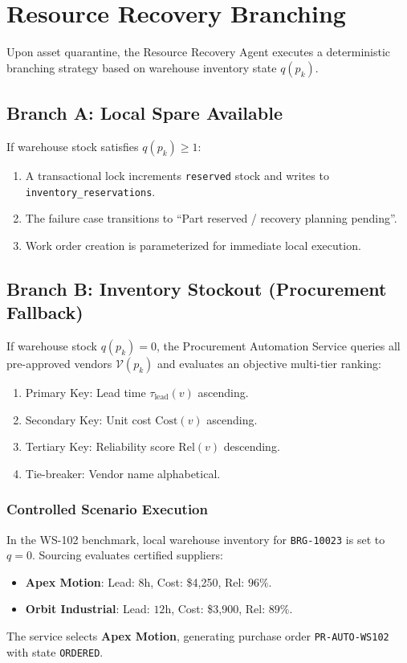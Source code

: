 \documentclass[10pt,twocolumn,a4paper]{article}
\begin{document}
\section{Resource Recovery Branching}
\label{sec:resource_recovery}
Upon asset quarantine, the Resource Recovery Agent executes a deterministic branching strategy based on warehouse inventory state $q(p_k)$.

\subsection{Branch A: Local Spare Available}
If warehouse stock satisfies $q(p_k) \ge 1$:
\begin{enumerate}
    \item A transactional lock increments \texttt{reserved} stock and writes to \texttt{inventory\_reservations}.
    \item The failure case transitions to ``Part reserved / recovery planning pending''.
    \item Work order creation is parameterized for immediate local execution.
\end{enumerate}

\subsection{Branch B: Inventory Stockout (Procurement Fallback)}
If warehouse stock $q(p_k) = 0$, the Procurement Automation Service queries all pre-approved vendors $\mathcal{V}(p_k)$ and evaluates an objective multi-tier ranking:
\begin{enumerate}
    \item Primary Key: Lead time $\tau_{\text{lead}}(v)$ ascending.
    \item Secondary Key: Unit cost $\text{Cost}(v)$ ascending.
    \item Tertiary Key: Reliability score $\text{Rel}(v)$ descending.
    \item Tie-breaker: Vendor name alphabetical.
\end{enumerate}

\subsubsection{Controlled Scenario Execution}
In the WS-102 benchmark, local warehouse inventory for \texttt{BRG-10023} is set to $q=0$. Sourcing evaluates certified suppliers:
\begin{itemize}
    \item \textbf{Apex Motion}: Lead: $8\text{h}$, Cost: \$4,250, Rel: $96\%$.
    \item \textbf{Orbit Industrial}: Lead: $12\text{h}$, Cost: \$3,900, Rel: $89\%$.
\end{itemize}
The service selects \textbf{Apex Motion}, generating purchase order \texttt{PR-AUTO-WS102} with state \texttt{ORDERED}.
\end{document}
